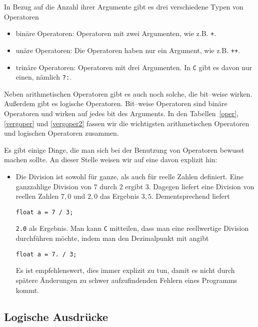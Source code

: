 In Bezug auf die Anzahl ihrer Argumente gibt es drei verschiedene Typen von Operatoren
\begin{itemize}
\item binäre Operatoren: Operatoren mit zwei Argumenten, wie z.B. \verb|+|.
\item unäre Operatoren: Die Operatoren haben nur ein Argument, wie z.B. \verb|++|.
\item trinäre Operatoren: Operatoren mit drei Argumenten. In \texttt{C} gibt es davon nur einen, nämlich \verb|?:|.%
\end{itemize} 
Neben arithmetischen Operatoren gibt es auch noch solche, die bit--weise wirken. 
Außerdem gibt es logische Operatoren.
Bit--weise Operatoren sind binäre Operatoren und wirken auf jedes bit des Arguments.
In den Tabellen~\ref{oper}, \ref{vergoper} und \ref{vergoper2} fassen wir die wichtigsten arithmetischen Operatoren und logischen Operatoren zusammen.

Es gibt einige Dinge, die man sich bei der Benutzung von Operatoren bewusst machen sollte.
An dieser Stelle weisen wir auf eine davon explizit hin:
\begin{itemize}
\item Die Division ist sowohl für ganze, als auch für reelle Zahlen definiert. 
  Eine ganzzahlige Division von $7$ durch $2$ ergibt $3$.
  Dagegen liefert eine Division von reellen Zahlen $7{,}0$ und $2{,}0$ das Ergebnis $3{,}5$.
  Dementsprechend liefert
\begin{lstlisting}
float a = 7 / 3;
\end{lstlisting}
  \verb|2.0| als Ergebnis. 
  Man kann \texttt{C} mitteilen, dass man eine reellwertige Division durchführen möchte, indem man den Dezimalpunkt mit angibt
\begin{lstlisting}
float a = 7. / 3;
\end{lstlisting}
Es ist empfehlenswert, dies immer explizit zu tun, damit es nicht durch spätere Änderungen zu schwer aufzufindenden Fehlern eines Programms kommt.
\end{itemize}

\subsection{Logische Ausdrücke}

